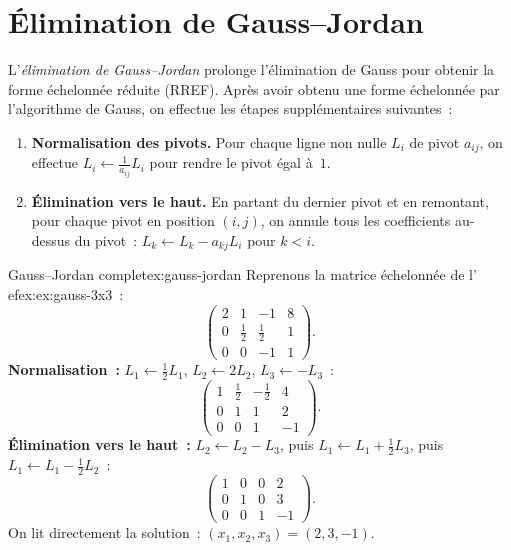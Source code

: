 \section{Élimination de Gauss--Jordan}\label{sec:gauss-jordan}

L'\emph{élimination de Gauss--Jordan}
prolonge l'élimination de Gauss pour obtenir la forme échelonnée réduite
(RREF). Après avoir obtenu une forme échelonnée par l'algorithme de Gauss,
on effectue les étapes supplémentaires suivantes~:

\begin{enumerate}[label=\textbf{Étape \arabic*.},leftmargin=*]
  \item\label{step:gj-norm} \textbf{Normalisation des pivots.} Pour chaque
    ligne non nulle $L_i$ de pivot $a_{ij}$, on effectue
    $L_i\leftarrow\frac{1}{a_{ij}}L_i$ pour rendre le pivot égal à~$1$.
  \item\label{step:gj-elim-haut} \textbf{Élimination vers le haut.}
    En partant du dernier pivot et en remontant, pour chaque pivot en
    position $(i,j)$, on annule tous les coefficients au-dessus du pivot~:
    $L_k\leftarrow L_k-a_{kj}L_i$ pour $k<i$.
\end{enumerate}

\begin{example}{Gauss--Jordan complet}{ex:gauss-jordan}
  Reprenons la matrice échelonnée de l'
ef{ex:ex:gauss-3x3}~:
  \[
    \left(\begin{array}{ccc|c}
      2 & 1 & -1 & 8\\[3pt]
      0 & \frac{1}{2} & \frac{1}{2} & 1\\[3pt]
      0 & 0 & -1 & 1
    \end{array}\right).
  \]
  \textbf{Normalisation~:}
  $L_1\leftarrow\frac{1}{2}L_1$, $L_2\leftarrow 2L_2$,
  $L_3\leftarrow -L_3$~:
  \[
    \left(\begin{array}{ccc|c}
      1 & \frac{1}{2} & -\frac{1}{2} & 4\\[3pt]
      0 & 1 & 1 & 2\\[3pt]
      0 & 0 & 1 & -1
    \end{array}\right).
  \]
  \textbf{Élimination vers le haut~:}
  $L_2\leftarrow L_2-L_3$, puis $L_1\leftarrow L_1+\frac{1}{2}L_3$,
  puis $L_1\leftarrow L_1-\frac{1}{2}L_2$~:
  \[
    \left(\begin{array}{ccc|c}
      1 & 0 & 0 & 2\\
      0 & 1 & 0 & 3\\
      0 & 0 & 1 & -1
    \end{array}\right).
  \]
  On lit directement la solution~: $(x_1,x_2,x_3)=(2,3,-1)$.
\end{example}

